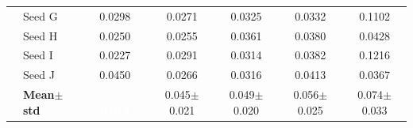 \begin{table}[H]
{\begin{tabular}{@{}llccccc@{}}
  & Seed G & {\small 0.0298} & {\small 0.0271} & {\small 0.0325} & {\small 0.0332} & {\small 0.1102} \\
  & Seed H & {\small 0.0250} & {\small 0.0255} & {\small 0.0361} & {\small 0.0380} & {\small 0.0428} \\
  & Seed I & {\small 0.0227} & {\small 0.0291} & {\small 0.0314} & {\small 0.0382} & {\small 0.1216} \\
  & Seed J & {\small 0.0450} & {\small 0.0266} & {\small 0.0316} & {\small 0.0413} & {\small 0.0367} \\
 & \textbf{Mean$\pm$std} & \cellcolor{ForestGreen!55}\textcolor{white}{\textbf{0.037$\pm$0.015}} & \cellcolor{ForestGreen!25}0.045$\pm$0.021 & \cellcolor{ForestGreen!25}0.049$\pm$0.020 & \cellcolor{ForestGreen!25}0.056$\pm$0.025 & \cellcolor{YellowGreen!30}0.074$\pm$0.033 \\
\bottomrule
\end{tabular}
}
\end{table}

